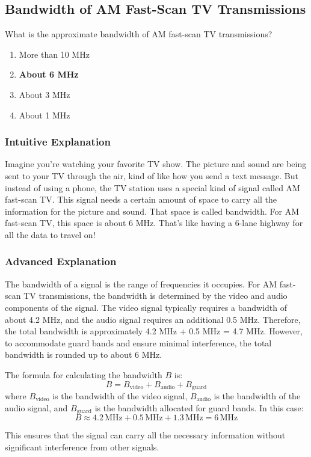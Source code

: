\subsection{Bandwidth of AM Fast-Scan TV Transmissions}
\label{T8A10}

\begin{tcolorbox}[colback=gray!10!white,colframe=black!75!black,title=T8A10]
What is the approximate bandwidth of AM fast-scan TV transmissions?
\begin{enumerate}[label=\Alph*)]
    \item More than 10 MHz
    \item \textbf{About 6 MHz}
    \item About 3 MHz
    \item About 1 MHz
\end{enumerate}
\end{tcolorbox}

\subsubsection{Intuitive Explanation}
Imagine you're watching your favorite TV show. The picture and sound are being sent to your TV through the air, kind of like how you send a text message. But instead of using a phone, the TV station uses a special kind of signal called AM fast-scan TV. This signal needs a certain amount of space to carry all the information for the picture and sound. That space is called bandwidth. For AM fast-scan TV, this space is about 6 MHz. That's like having a 6-lane highway for all the data to travel on!

\subsubsection{Advanced Explanation}
The bandwidth of a signal is the range of frequencies it occupies. For AM fast-scan TV transmissions, the bandwidth is determined by the video and audio components of the signal. The video signal typically requires a bandwidth of about 4.2 MHz, and the audio signal requires an additional 0.5 MHz. Therefore, the total bandwidth is approximately 4.2 MHz + 0.5 MHz = 4.7 MHz. However, to accommodate guard bands and ensure minimal interference, the total bandwidth is rounded up to about 6 MHz.

The formula for calculating the bandwidth \( B \) is:
\[
B = B_{\text{video}} + B_{\text{audio}} + B_{\text{guard}}
\]
where \( B_{\text{video}} \) is the bandwidth of the video signal, \( B_{\text{audio}} \) is the bandwidth of the audio signal, and \( B_{\text{guard}} \) is the bandwidth allocated for guard bands. In this case:
\[
B \approx 4.2 \, \text{MHz} + 0.5 \, \text{MHz} + 1.3 \, \text{MHz} = 6 \, \text{MHz}
\]

This ensures that the signal can carry all the necessary information without significant interference from other signals.

